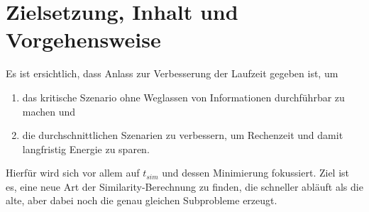 \section{Zielsetzung, Inhalt und Vorgehensweise}

Es ist ersichtlich, dass Anlass zur Verbesserung der Laufzeit gegeben ist, um 
\begin{enumerate}
\item das kritische Szenario ohne Weglassen von Informationen durchführbar zu machen und
\item die durchschnittlichen Szenarien zu verbessern, um Rechenzeit und damit langfristig Energie zu sparen.  
\end{enumerate}  
Hierfür wird sich vor allem auf $t_{sim}$ und dessen Minimierung fokussiert. Ziel ist es, eine neue Art der Similarity-Berechnung zu finden, die schneller abläuft als die alte, aber dabei noch die genau gleichen Subprobleme erzeugt. 